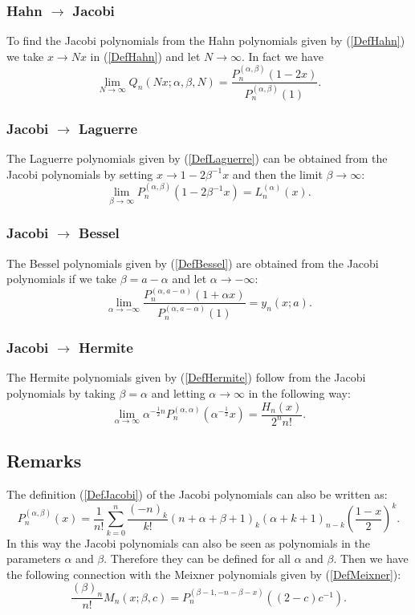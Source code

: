 \documentclass[envcountchap,graybox]{svmono}
\newcounter{rom}
\begin{document}
\subsubsection*{Hahn $\rightarrow$ Jacobi}
To find the Jacobi polynomials from the Hahn polynomials given by (\ref{DefHahn}) we take
$x\rightarrow Nx$ in (\ref{DefHahn}) and let $N\rightarrow\infty$. In fact we have
$$\lim_{N\rightarrow\infty}
Q_n(Nx;\alpha,\beta,N)=\frac{P_n^{(\alpha,\beta)}(1-2x)}{P_n^{(\alpha,\beta)}(1)}.$$

\subsubsection*{Jacobi $\rightarrow$ Laguerre}
The Laguerre polynomials given by (\ref{DefLaguerre}) can be obtained from the Jacobi
polynomials by setting $x\rightarrow 1-2\beta^{-1}x$ and then the limit $\beta\rightarrow\infty$:
\begin{equation}
\lim_{\beta\rightarrow\infty}
P_n^{(\alpha,\beta)}(1-2\beta^{-1}x)=L_n^{(\alpha)}(x).
\end{equation}

\subsubsection*{Jacobi $\rightarrow$ Bessel}
The Bessel polynomials given by (\ref{DefBessel}) are obtained from the Jacobi polynomials
if we take $\beta=a-\alpha$ and let $\alpha\rightarrow-\infty$:
\begin{equation}
\lim_{\alpha\rightarrow-\infty}
\frac{P_n^{(\alpha,a-\alpha)}(1+\alpha x)}{P_n^{(\alpha,a-\alpha)}(1)}=y_n(x;a).
\end{equation}

\subsubsection*{Jacobi $\rightarrow$ Hermite}
The Hermite polynomials given by (\ref{DefHermite}) follow from the Jacobi polynomials
by taking $\beta=\alpha$ and letting $\alpha\rightarrow\infty$ in the following way:
\begin{equation}
\lim_{\alpha\rightarrow\infty}
\alpha^{-\frac{1}{2}n}P_n^{(\alpha,\alpha)}(\alpha^{-\frac{1}{2}}x)=\frac{H_n(x)}{2^nn!}.
\end{equation}

\subsection*{Remarks}
The definition (\ref{DefJacobi}) of the Jacobi polynomials can also be written as:
$$P_n^{(\alpha,\beta)}(x)=\frac{1}{n!}\sum_{k=0}^n\frac{(-n)_k}{k!}
(n+\alpha+\beta+1)_k(\alpha+k+1)_{n-k}\left(\frac{1-x}{2}\right)^k.$$
In this way the Jacobi polynomials can also be seen as polynomials in the parameters $\alpha$
and $\beta$. Therefore they can be defined for all $\alpha$ and $\beta$. Then we have the
following connection with the Meixner polynomials given by (\ref{DefMeixner}):
$$\frac{(\beta)_n}{n!}M_n(x;\beta,c)=P_n^{(\beta-1,-n-\beta-x)}((2-c)c^{-1}).$$
\end{document}
